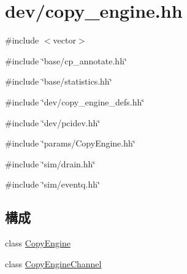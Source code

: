 \hypertarget{copy__engine_8hh}{
\section{dev/copy\_\-engine.hh}
\label{copy__engine_8hh}
}
{\ttfamily \#include $<$vector$>$}\par
{\ttfamily \#include \char`\"{}base/cp\_\-annotate.hh\char`\"{}}\par
{\ttfamily \#include \char`\"{}base/statistics.hh\char`\"{}}\par
{\ttfamily \#include \char`\"{}dev/copy\_\-engine\_\-defs.hh\char`\"{}}\par
{\ttfamily \#include \char`\"{}dev/pcidev.hh\char`\"{}}\par
{\ttfamily \#include \char`\"{}params/CopyEngine.hh\char`\"{}}\par
{\ttfamily \#include \char`\"{}sim/drain.hh\char`\"{}}\par
{\ttfamily \#include \char`\"{}sim/eventq.hh\char`\"{}}\par
\subsection*{構成}
\begin{DoxyCompactItemize}
\item 
class \hyperlink{classCopyEngine}{CopyEngine}
\item 
class \hyperlink{classCopyEngine_1_1CopyEngineChannel}{CopyEngineChannel}
\end{DoxyCompactItemize}
